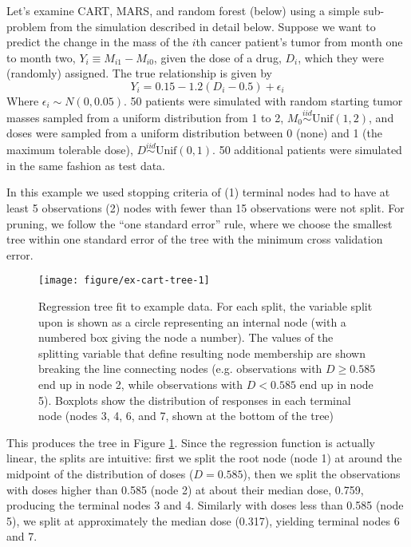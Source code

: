 \documentclass[12pt]{article}
\begin{document}
Let's examine CART, MARS, and random forest (below) using a simple sub-problem from the simulation described in detail below. Suppose we want to predict the change in the mass of the $i$th cancer patient's tumor from month one to month two, $Y_{i} \equiv M_{i1} - M_{i0}$, given the dose of a drug, $D_{i}$, which they were (randomly) assigned. The true relationship is given by
\begin{equation}
  Y_{i} = 0.15 - 1.2 (D_{i} - 0.5) + \epsilon_{i}
\end{equation}
Where $\epsilon_{i} \sim N(0, 0.05)$. 50 patients were simulated with random starting tumor masses sampled from a uniform distribution from 1 to 2, $M_{0} \overset{iid}{\sim} \text{Unif}(1, 2)$, and doses were sampled from a uniform distribution between 0 (none) and 1 (the maximum tolerable dose), $D \overset{iid}{\sim} \text{Unif}(0, 1)$. 50 additional patients were simulated in the same fashion as test data.

In this example we used stopping criteria of (1) terminal nodes had to have at least 5 observations (2) nodes with fewer than 15 observations were not split. For pruning, we follow the ``one standard error'' rule, where we choose the smallest tree within one standard error of the tree with the minimum cross validation error.

\begin{figure}[!htbp]

{\centering \texttt{[image: figure/ex-cart-tree-1]} 

}

\caption[Regression tree fit to example data]{Regression tree fit to example data. For each split, the variable split upon is shown as a circle representing an internal node (with a numbered box giving the node a number). The values of the splitting variable that define resulting node membership are shown breaking the line connecting nodes (e.g. observations with $D \geq 0.585$ end up in node 2, while observations with $D < 0.585$ end up in node 5). Boxplots show the distribution of responses in each terminal node (nodes 3, 4, 6, and 7, shown at the bottom of the tree)}\label{fig:ex-cart-tree}
\end{figure}

This produces the tree in Figure \ref{fig:ex-cart-tree}. Since the regression function is actually linear, the splits are intuitive: first we split the root node (node 1) at around the midpoint of the distribution of doses ($D = 0.585$), then we split the observations with doses higher than 0.585 (node 2) at about their median dose, 0.759, producing the terminal nodes 3 and 4. Similarly with doses less than 0.585 (node 5), we split at approximately the median dose (0.317), yielding terminal nodes 6 and 7.
\end{document}
